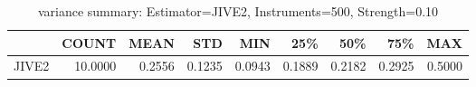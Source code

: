 \begin{table}[ht]
\centering
\caption{variance summary: Estimator=JIVE2, Instruments=500, Strength=0.10}
\begin{tabular}{lrrrrrrrr}
\toprule
 & COUNT & MEAN & STD & MIN & 25\% & 50\% & 75\% & MAX \\
\midrule
JIVE2 & 10.0000 & 0.2556 & 0.1235 & 0.0943 & 0.1889 & 0.2182 & 0.2925 & 0.5000 \\
\bottomrule
\end{tabular}
\end{table}
